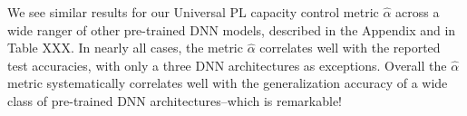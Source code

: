 We see similar results for our Universal PL capacity control metric $\hat{\alpha}$ across a wide ranger of  other pre-trained DNN models, 
described in the Appendix and in Table XXX.  In nearly all cases, the metric  $\hat{\alpha}$  correlates well with the reported test accuracies,
with only a three DNN architectures as exceptions.  Overall the $\hat{\alpha}$ metric systematically correlates well with the
generalization accuracy of a wide class of pre-trained DNN architectures--which is remarkable!